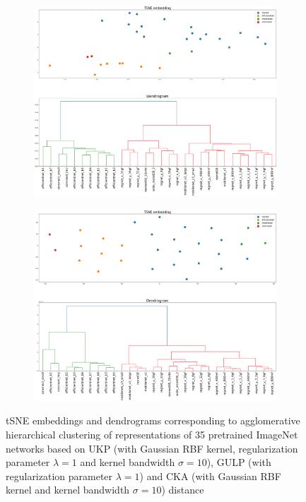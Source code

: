 \documentclass{article}
\theoremstyle{plain}
\newcommand{\metricstname}{UKP }
\begin{document}
\begin{figure}[!h]
    \begin{subfigure}[b]{0.45\textwidth}
        \includegraphics[width=\textwidth]{Appendix figures/imagenet_experiments/Additional comparisons for UKP with GULP and CKA/DendogramandTSNE for GULP_dist_1.000000e+00.png}
    \end{subfigure}
    \hfill
    \begin{subfigure}[b]{0.45\textwidth}
        \includegraphics[width=\textwidth]{Appendix figures/imagenet_experiments/Additional comparisons for UKP with GULP and CKA/DendogramandTSNE for CKA_dist_RBF_1.000000e+01.png}
    \end{subfigure}

     \caption{tSNE embeddings and dendrograms corresponding to agglomerative hierarchical clustering of representations of 35 pretrained ImageNet networks based on \metricstname (with Gaussian RBF kernel, regularization parameter $\lambda=1$ and kernel bandwidth $\sigma=10$), GULP (with regularization parameter $\lambda=1$) and CKA (with Gaussian RBF kernel and kernel bandwidth $\sigma=10$) distance}
    \label{ImageNet dendrograms additional}
\end{figure}
\end{document}

